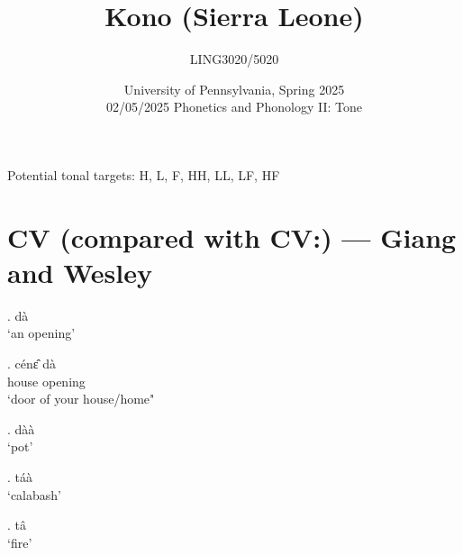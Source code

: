 \documentclass{assets/fieldnotes}
\title{Kono (Sierra Leone)}
\author{LING3020/5020}
\date{University of Pennsylvania, Spring 2025\\02/05/2025 Phonetics and Phonology II: Tone }
\begin{document}
\maketitle
\tableofcontents

\newpage

Potential tonal targets: H, L, F, HH, LL, LF, HF

\section{CV (compared with CV:) --- Giang and Wesley}






\ex. dà\\
`an opening' 

\exg. cénɛ̂ dà\\
house opening\\
`door of your house/home"\\

\ex. dàà\\
`pot'\\

\ex. táà\\
`calabash'\\

\ex. tâ\\
`fire'\\
\end{document}
